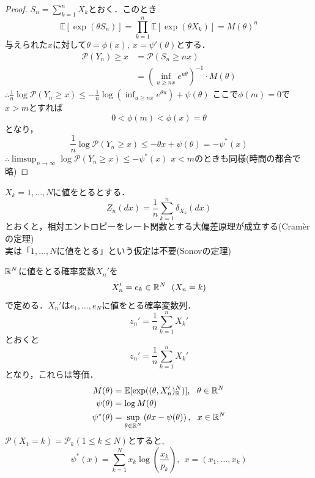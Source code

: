 \documentclass[dvipdfmx, leqno]{jsbook}
\begin{document}
\begin{proof}
    $S_n= \sum_{k= 1}^n X_k$とおく．このとき
\begin{equation}
    \mathbb{E}[\exp(\theta S_n)]= \prod_{k= 1}^n \mathbb{E}[\exp(\theta X_k)]= M(\theta)^n
\end{equation}
    与えられた$x$に対して$\theta= \phi(x),\ x= \psi'(\theta)$とする．
\begin{align}
    \mathcal{P}(Y_n)\ge x
    &= \mathcal{P}(S_n\ge nx)\\
    &= \left(\inf_{u\ge nx} e^{u\theta}\right)^{-1}\cdot M(\theta)
\end{align}
    $\therefore \frac{1}{n}\log{\mathcal{P}(Y_n\ge x)}\le -\frac{1}{n}\log{\left(\inf_{u\ge nx} e^{\theta u}\right)}+ \psi(\theta)$
    ここで$\phi(m)= 0$で$x> m$とすれば
\begin{equation}
    0< \phi(m)< \phi(x)= \theta
\end{equation}
    となり，
\begin{equation}
    \frac{1}{n}\log{\mathcal{P}(Y_n\ge x)}\le -\theta x+ \psi(\theta)= -\psi^*(x)
\end{equation}
    $\therefore \limsup_{n\to \infty} \log{\mathcal{P}(Y_n\ge x)}\le -\psi^*(x)$
    $x< m$のときも同様(時間の都合で略)
\end{proof}
    $X_k= 1, \ldots, N$に値をとるとする．
\begin{equation}
    Z_n(dx)= \frac{1}{n}\sum_{k= 1}^n \delta_{X_k}(dx)
\end{equation}
    とおくと，相対エントロピーをレート関数とする大偏差原理が成立する(Cram\`erの定理)\\
    実は「$1, \ldots, N$に値をとる」という仮定は不要(Sonovの定理)

    $\mathbb{R}^N$に値をとる確率変数$X_n'$を
\begin{equation}
    X_n'= e_k\in \mathbb{R}^N\ \ (X_n= k)
\end{equation}
    で定める．$X_n'$は$e_1, \ldots, e_N$に値をとる確率変数列．
\begin{equation}
    z_n'= \frac{1}{n}\sum_{k= 1}^n X_k'
\end{equation}
    とおくと
\begin{equation}
    z_n'= \frac{1}{n}\sum_{k= 1}^n X_k'
\end{equation}
    となり，これらは等価．
\begin{align}
    M(\theta)&= \mathbb{E}[\exp((\theta, X_n')_{\mathbb{R}}^N)],\ \ \theta\in \mathbb{R}^N\\
    \psi(\theta)&= \log{M(\theta)}\\
    \psi^*(\theta)&= \sup_{\theta\in \mathbb{R}^N} \left(\theta x- \psi(\theta)\right),\ \ x\in \mathbb{R}^N
\end{align}
    $\mathcal{P}(X_1= k)= \mathcal{P}_k(1\le k\le N)$とすると,
\begin{equation}
    \psi^*(x)= \sum_{k= 1}^N x_k\log{\left(\frac{x_k}{p_k}\right)},\ \ x= (x_1, \ldots, x_k)
\end{equation}
\fi
\end{document}
